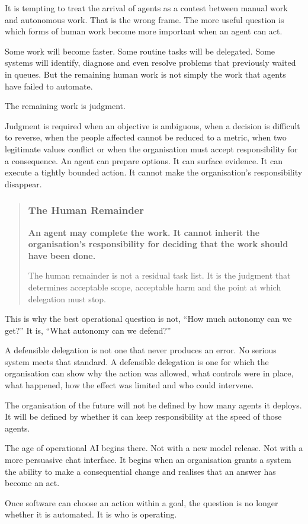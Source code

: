 It is tempting to treat the arrival of agents as a contest between
manual work and autonomous work. That is the wrong frame. The more
useful question is which forms of human work become more important when
an agent can act.

Some work will become faster. Some routine tasks will be delegated. Some
systems will identify, diagnose and even resolve problems that
previously waited in queues. But the remaining human work is not simply
the work that agents have failed to automate.

The remaining work is judgment.

Judgment is required when an objective is ambiguous, when a decision is
difficult to reverse, when the people affected cannot be reduced to a
metric, when two legitimate values conflict or when the organisation
must accept responsibility for a consequence. An agent can prepare
options. It can surface evidence. It can execute a tightly bounded
action. It cannot make the organisation's responsibility disappear.

\begin{quote}
\subsubsection{The Human Remainder}\label{the-human-remainder}

\textbf{An agent may complete the work. It cannot inherit the
organisation's responsibility for deciding that the work should have
been done.}

The human remainder is not a residual task list. It is the judgment that
determines acceptable scope, acceptable harm and the point at which
delegation must stop.
\end{quote}

This is why the best operational question is not, ``How much autonomy
can we get?'' It is, ``What autonomy can we defend?''

A defensible delegation is not one that never produces an error. No
serious system meets that standard. A defensible delegation is one for
which the organisation can show why the action was allowed, what
controls were in place, what happened, how the effect was limited and
who could intervene.

The organisation of the future will not be defined by how many agents it
deploys. It will be defined by whether it can keep responsibility at the
speed of those agents.

The age of operational AI begins there. Not with a new model release.
Not with a more persuasive chat interface. It begins when an
organisation grants a system the ability to make a consequential change
and realises that an answer has become an act.

Once software can choose an action within a goal, the question is no
longer whether it is automated. It is who is operating.
